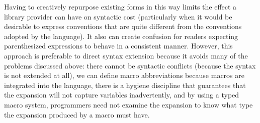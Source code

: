 Having to creatively repurpose existing forms in this way limits the effect a library provider can have on syntactic cost (particularly when it would be desirable to express conventions that are quite different from the conventions adopted by the language). It also can create confusion for readers expecting parenthesized expressions to behave in a consistent manner. However,  this approach is preferable to direct syntax extension because it avoids many of the problems discussed above: there cannot be syntactic conflicts (because the syntax is not extended at all), we can define macro abbreviations because macros are integrated into the language, there is a hygiene discipline that guarantees that the expansion will not capture variables inadvertently, and by using a typed macro system, programmers need not examine the expansion to know what type the expansion produced by a macro must have. 